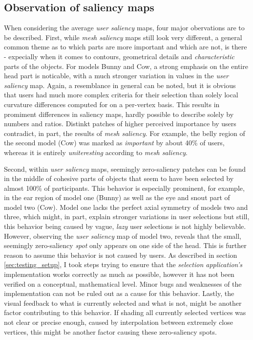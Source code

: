 		\subsection{Observation of saliency maps}
		\label{sec:mesh_saliency_with_mechanical_objects}
When considering the average \textit{user saliency} maps, four major obervations are to be described. First, while \textit{mesh saliency} maps still look very different, a general common theme as to which parts are more important and which are not, is there - expecially when it comes to contours, geometrical details and \textit{characteristic} parts of the objects. For models Bunny and Cow, a strong emphasis on the entire head part is noticable, with a much stronger variation in values in the \textit{user saliency} map. Again, a resemblance in general can be noted, but it is obvious that users had much more complex criteria for their selection than solely local curvature differences computed for on a per-vertex basis. This results in promiment differences in saliency maps, hardly possible to describe solely by numbers and ratios. Distinkt patches of higher perceived importance by users contradict, in part, the results of \textit{mesh saliency}. For example, the belly region of the second model (Cow) was marked as \textit{important} by about 40\% of users, whereas it is entirely \textit{uniteresting} according to \textit{mesh saliency}.

Second, within \textit{user saliency} maps, seemingly zero-saliency patches can be found in the middle of cohesive parts of objects that seem to have been selected by almost 100\% of participants. This behavior is especially prominent, for example, in the ear region of model one (Bunny) as well as the eye and snout part of model two (Cow). Model one lacks the perfect axial symmetry of models two and three, which might, in part, explain stronger variations in user selections but still, this behavior being caused by vague, \textit{lazy} user selections is not highly believable. However, observing the \textit{user saliency} map of model two, reveals that the small, seemingly zero-saliency \textit{spot} only appears on one side of the head. This is further reason to assume this behavior is not caused by users. As described in section \ref{sec:testing_setup}, I took steps trying to ensure that the \textit{selection application's} implementation works correctly as much as possible, however it has not been verified on a conceptual, mathematical level. Minor bugs and weaknesses of the implementation can not be ruled out as a cause for this behavior. Lastly, the visual feedback to what is currently selected and what is not, might be another factor contributing to this behavior. If shading all currently selected vertices was not clear or precise enough, caused by interpolation between extremely close vertices, this might be another factor causing these zero-saliency spots.


